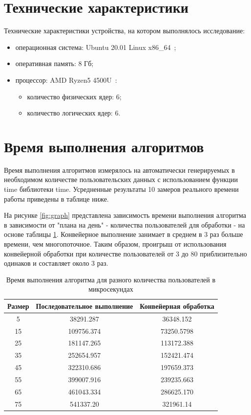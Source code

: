\documentclass[a4paper,oneside,14pt]{extreport}
\begin{document}
\section{Технические характеристики}
Технические характеристики устройства, на котором выполнялось исследование:
\begin{itemize}
	\item операционная система: Ubuntu 20.01 Linux x86\_64~\cite{ubuntu};
	\item оперативная память: 8 Гб;
	\item процессор: AMD Ryzen5 4500U~\cite{processor}:
	\begin{itemize}
		\item количество физических ядер: 6;
		\item количество логических ядер: 6.
	\end{itemize}
\end{itemize}

\section{Время выполнения алгоритмов}
Время выполнения алгоритмов измерялось на автоматически генерируемых в необходимом количестве пользовательских данных с использованием функции time библиотеки time. Усредненные результаты 10 замеров реального времени работы приведены в таблице ниже.

На рисунке \ref{fig:graph} представлена зависимость времени выполнения алгоритма в зависимости от "плана на день" - количества пользователей для обработки - на основе таблицы \ref{tab:time}. Конвейерное выполнение занимает в среднем в 3 раз больше времени, чем многопоточное. Таким образом, проигрыш от использования конвейерной обработки при количестве пользователей от 3 до 80 приблизительно одинаков и составляет около 3 раз.
\begin{table}[H]
	\begin{center}
		\captionsetup{justification=raggedleft, singlelinecheck=false}
		\caption{\label{tab:time} Время выполнения алгоритма для разного количества пользователей в микросекундах}
		\begin{tabular}{|c| c | c|} 
			\hline
			Размер&Последовательное выполнение&Конвейерная обработка\\ [0.5ex]
			\hline
	   		   5 &   38291.287 &  36348.152\\ 
	   		\hline
	   		15 &   109756.374 &   73250.5798 \\ 
	   		\hline
	   		25 &   181147.265 &   113172.388 \\ 
	   		\hline
	   		35 &   252654.957 &   152421.474 \\ 
	   		\hline
	   		45 &  322310.686 &  197659.373 \\ 
	   		\hline
	   		55 & 399007.916 & 239235.663 \\ 
	   		\hline
	   		65 & 461043.334 & 286625.170 \\ 
	   		\hline
	   		75 & 541337.20 & 321961.14 \\ 
	   		\hline
		\end{tabular}
	\end{center}
\end{table}
\end{document}
